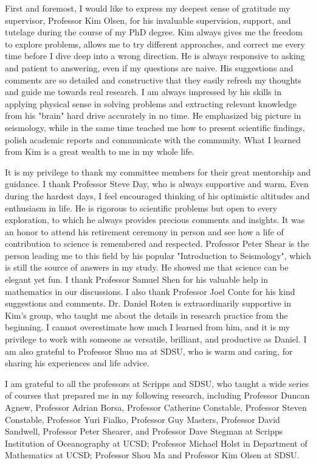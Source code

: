 \begin{frontmatter}
\begin{acknowledgements}
        First and foremost, I would like to express my deepest sense of gratitude my supervisor, Professor Kim Olsen, for his invaluable supervision, support, and tutelage during the course of my PhD degree. Kim always gives me the freedom to explore problems, allows me to try different approaches, and correct me every time before I dive deep into a wrong direction. He is always responsive to asking and patient to answering, even if my questions are naive. His suggestions and comments are so detailed and constructive that they easily refresh my thoughts and guide me towards real research. I am always impressed by his skills in applying physical sense in solving problems and extracting relevant knowledge from his "brain" hard drive accurately in no time. He emphasized big picture in seismology, while in the same time teached me how to present scientific findings, polish academic reports and communicate with the community. What I learned from Kim is a great wealth to me in my whole life.

        It is my privilege to thank my committee members for their great mentorship and guidance. I thank Professor Steve Day, who is always supportive and warm. Even during the hardest days, I feel encouraged thinking of his optimistic altitudes and enthusiasm in life. He is rigorous to scientific problems but open to every exploration, to which he always provides precious comments and insights. It was an honor to attend his retirement ceremony in person and see how a life of contribution to science is remembered and respected. Professor Peter Shear is the person leading me to this field by his popular "Introduction to Seismology", which is still the source of answers in my study. He showed me that science can be elegant yet fun. I thank Professor Samuel Shen for his valuable help in mathematics in our discussions. I also thank Professor Joel Conte for his kind suggestions and comments. Dr. Daniel Roten is extraordinarily supportive in Kim's group, who taught me about the details in research practice from the beginning. I cannot overestimate how much I learned from him, and it is my privilege to work with someone as versatile, brilliant, and productive as Daniel. I am also grateful to Professor Shuo ma at SDSU, who is warm and caring, for sharing his experiences and life advice.

        I am grateful to all the professors at Scripps and SDSU, who taught a wide series of courses that prepared me in my following research, including Professor Duncan Agnew, Professor Adrian Borsa, Professor Catherine Constable, Professor Steven Constable, Professor Yuri Fialko, Professor Guy Masters, Professor David Sandwell, Professor Peter Shearer, and Professor Dave Stegman at Scripps Institution of Oceanography at UCSD; Professor Michael Holst in Department of Mathematics at UCSD; Professor Shou Ma and Professor Kim Olsen at SDSU.


\end{acknowledgements}
\end{frontmatter}
